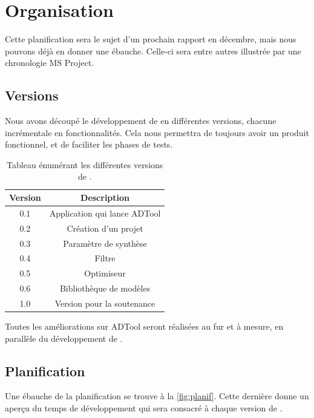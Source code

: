 \section{Organisation}
	 Cette planification sera le sujet d'un prochain rapport en décembre, mais nous pouvons déjà en donner une ébauche. Celle-ci sera entre autres illustrée par une chronologie MS Project.

	\subsection{Versions}
		Nous avons découpé le développement de \glasir en différentes versions, chacune incrémentale en fonctionnalités. Cela nous permettra de toujours avoir un produit fonctionnel, et de faciliter les phases de tests.

		\begin{table}[h!]
			\begin{center}
			\begin{tabular}{|c|c|}
				\hline
				Version & Description\\
				\hline
				0.1 & Application qui lance ADTool\\
				\hline
				0.2 & Création d'un projet\\
				\hline
				0.3 & Paramètre de synthèse\\
				\hline
				0.4 & Filtre\\
				\hline
				0.5 & Optimiseur\\
				\hline
				0.6 & Bibliothèque de modèles\\
				\hline
				1.0 & Version pour la soutenance\\
				\hline
			\end{tabular}
			\end{center}
			\caption{Tableau énumérant les différentes versions de \glasir.}
		\end{table} %

		Toutes les améliorations sur ADTool seront réalisées au fur et à mesure, en parallèle du développement de \glasir.

	\subsection{Planification}
		Une ébauche de la planification se trouve à la {} \ref{fig:planif}. Cette dernière donne un aperçu du temps de développement qui sera consacré à chaque version de \glasir. 

